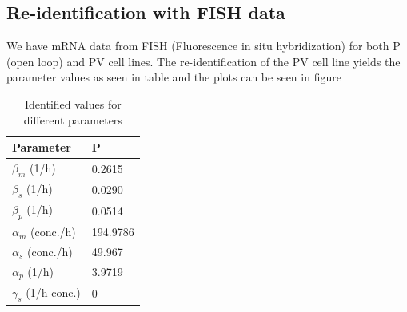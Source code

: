 \documentclass{article}
\begin{document}
\subsection{Re-identification with FISH data}

We have mRNA data from FISH (Fluorescence in situ hybridization) for both P (open loop) and  PV cell lines. The re-identification of the PV cell line yields the parameter values as seen in table and the plots can be seen in figure 


\begin{table}[h!]
\begin{center}
\begin{tabular}{|l|l|}
\hline
Parameter & P \\\hline
$\beta_m$ (1/h) &0.2615\\\hline
$\beta_s$ (1/h) &0.0290\\\hline
$\beta_p$ (1/h) &0.0514\\\hline
$\alpha_m$ (conc./h) &194.9786\\\hline
$\alpha_s$ (conc./h) &49.967\\\hline
$\alpha_p$ (1/h) &3.9719\\\hline
$\gamma_s$ (1/h conc.) &0\\\hline
\end{tabular}
\end{center}
\caption{Identified values for different parameters}
\label{paramTableOpenFish}
\end{table}
\end{document}
